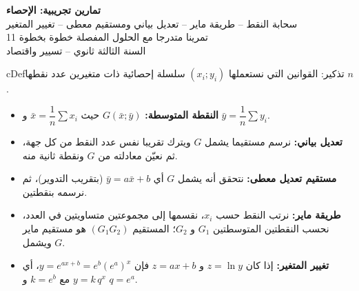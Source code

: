 \documentclass[12pt,a4paper]{article}
\newenvironment{BOX}[2]{\begin{otherlanguage}{english}\begin{arbox}{#1}{#2}}{\end{arbox}\end{otherlanguage}}
\newenvironment{tarif}[1][تعريف]{\begin{BOX}{cDef}{#1}}{\end{BOX}}
\newenvironment{LTR}{\begin{otherlanguage}{english}}{\end{otherlanguage}}
\begin{document}
\begin{LTR}
\begin{tcolorbox}[enhanced,colback=cSec,colframe=cSec,arc=3mm,halign=center,boxrule=0pt,top=12pt,bottom=12pt,before upper={\selectlanguage{arabic}}]
{\color{white}\fontsize{24}{32}\selectfont\bfseries تمارين تجريبية: الإحصاء}\\[8pt]
{\color{white}\large سحابة النقط -- طريقة ماير -- تعديل بياني ومستقيم معطى -- تغيير المتغير}\\[5pt]
{\color{white}\large 11 تمرينا متدرجا مع الحلول المفصلة خطوة بخطوة}\\[5pt]{\color{white}\large السنة الثالثة ثانوي -- تسيير واقتصاد}
\end{tcolorbox}
\end{LTR}

\begin{tarif}[تذكير: القوانين التي نستعملها]
$(x_i;y_i)$ سلسلة إحصائية ذات متغيرين عدد نقطها $n$.
\begin{itemize}
\item \textbf{النقطة المتوسطة:} $G(\bar x;\bar y)$ حيث $\bar x=\dfrac{1}{n}\sum x_i$ و $\bar y=\dfrac{1}{n}\sum y_i$.
\item \textbf{تعديل بياني:} نرسم مستقيما يشمل $G$ ويترك تقريبا نفس عدد النقط من كل جهة، ثم نعيّن معادلته من $G$ ونقطة ثانية منه.
\item \textbf{مستقيم تعديل معطى:} نتحقق أنه يشمل $G$ أي $\bar y=a\bar x+b$ (بتقريب التدوير)، ثم نرسمه بنقطتين.
\item \textbf{طريقة ماير:} نرتب النقط حسب $x_i$، نقسمها إلى مجموعتين متساويتين في العدد، نحسب النقطتين المتوسطتين $G_1$ و $G_2$؛ المستقيم $(G_1G_2)$ هو مستقيم ماير ويشمل $G$.
\item \textbf{تغيير المتغير:} إذا كان $z=\ln y$ و $z=ax+b$ فإن $y=e^{ax+b}=e^{b}\left(e^{a}\right)^{x}$، أي $y=k\,q^{x}$ مع $k=e^{b}$ و $q=e^{a}$.
\end{itemize}
\end{tarif}
\end{document}

